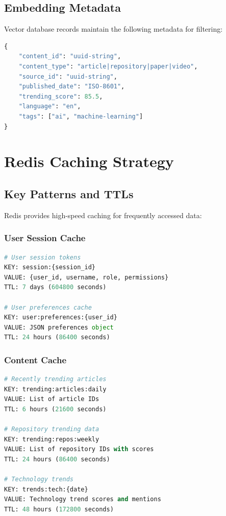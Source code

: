 \documentclass[12pt,a4paper]{report}
\begin{document}
\section{Embedding Metadata}

Vector database records maintain the following metadata for filtering:

\begin{lstlisting}[language=Python]
{
    "content_id": "uuid-string",
    "content_type": "article|repository|paper|video",
    "source_id": "uuid-string",
    "published_date": "ISO-8601",
    "trending_score": 85.5,
    "language": "en",
    "tags": ["ai", "machine-learning"]
}
\end{lstlisting}

\newpage

\chapter{Redis Caching Strategy}

\section{Key Patterns and TTLs}

Redis provides high-speed caching for frequently accessed data:

\subsection{User Session Cache}

\begin{lstlisting}[language=Python,basicstyle=\ttfamily\small]
# User session tokens
KEY: session:{session_id}
VALUE: {user_id, username, role, permissions}
TTL: 7 days (604800 seconds)

# User preferences cache
KEY: user:preferences:{user_id}
VALUE: JSON preferences object
TTL: 24 hours (86400 seconds)
\end{lstlisting}

\subsection{Content Cache}

\begin{lstlisting}[language=Python,basicstyle=\ttfamily\small]
# Recently trending articles
KEY: trending:articles:daily
VALUE: List of article IDs
TTL: 6 hours (21600 seconds)

# Repository trending data
KEY: trending:repos:weekly
VALUE: List of repository IDs with scores
TTL: 24 hours (86400 seconds)

# Technology trends
KEY: trends:tech:{date}
VALUE: Technology trend scores and mentions
TTL: 48 hours (172800 seconds)
\end{lstlisting}
\end{document}

